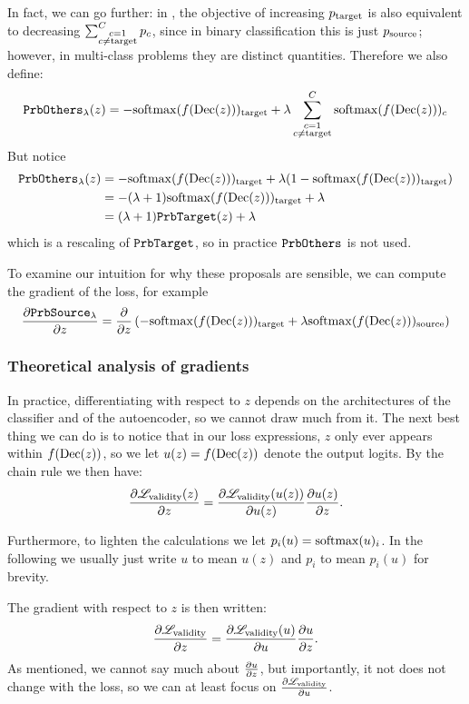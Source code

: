 \documentclass[../main.tex]{subfiles}
\begin{document}
In fact, we can go further:
in \ls{}, the objective of increasing $p_{\mathrm{target}}$ is also equivalent to decreasing $\sum_{\substack{{c}=1 \\ {c} \neq \mathrm{target}}}^C p_c$, since in binary classification this is just $p_{\mathrm{source}}$; however, in multi-class problems they are distinct quantities.
Therefore we also define:
\begin{align*}
    \mathtt{PrbOthers}_{\lambda}(z) = - \mathrm{softmax}(f(\operatorname{Dec}(z)))_{\mathrm{target}} + \lambda \sum_{\substack{{c}=1 \\ {c} \neq \mathrm{target}}}^C \mathrm{softmax}(f(\operatorname{Dec}(z)))_c
\end{align*}
But notice
\begin{align*}
    \mathtt{PrbOthers}_{\lambda}(z)
     & = - \mathrm{softmax}(f(\operatorname{Dec}(z)))_{\mathrm{target}} + \lambda (1 - \mathrm{softmax}(f(\operatorname{Dec}(z)))_{\mathrm{target}}) \\
     & = -(\lambda + 1) \mathrm{softmax}(f(\operatorname{Dec}(z)))_{\mathrm{target}} + \lambda \\
     & = (\lambda + 1) \mathtt{PrbTarget}(z) + \lambda
\end{align*}
which is a rescaling of $\mathtt{PrbTarget}$, so in practice $\mathtt{PrbOthers}_{}$ is not used.

To examine our intuition for why these proposals are sensible, we can compute the gradient of the loss, for example
\begin{align*}
\frac{\partial \mathtt{PrbSource}_{\lambda}}{\partial z}
=  \frac{\partial }{\partial z} \left( - \mathrm{softmax}(f(\operatorname{Dec}(z)))_{\mathrm{target}} + \lambda \mathrm{softmax}(f(\operatorname{Dec}(z)))_{\mathrm{source}} \right)
\end{align*}

\subsubsection{Theoretical analysis of gradients}

In practice, differentiating with respect to $z$ depends on the architectures of the classifier and of
the autoencoder, so we cannot draw much from it.
The next best thing we can do is to notice that in our loss expressions,
$z$ only ever appears within $f(\operatorname{Dec}(z))$,
so we let $u(z) = f(\operatorname{Dec}(z))$ denote the output logits.
By the chain rule we then have:
\begin{align*}
 \frac{\partial \mathscr{L}_\text{validity}(z)}{\partial z} = \frac{\partial \mathscr{L}_\text{validity}(u(z))}{\partial u(z)} \frac{\partial u(z)}{\partial z}.
\end{align*}

Furthermore, to lighten the calculations we let $p_i(u) = \mathrm{softmax}(u)_i$.
In the following we usually just write $u$ to mean $u(z)$ and $p_i$ to mean $p_i(u)$ for brevity.

The gradient with respect to $z$ is then written:
\begin{align*}
 \frac{\partial \mathscr{L}_\text{validity}}{\partial z} = \frac{\partial \mathscr{L}_\text{validity}(u)}{\partial u} \frac{\partial u}{\partial z}.
\end{align*}
As mentioned, we cannot say much about $\frac{\partial u}{\partial z}$, but importantly, it not does not change with the loss,
so we can at least focus on $\frac{\partial \mathscr{L}_\text{validity}}{\partial u}$.
\end{document}
